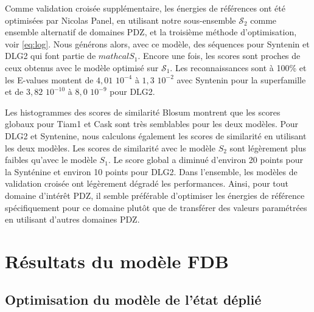 Comme validation croisée supplémentaire, les énergies de références ont été optimisées par Nicolas Panel, en utilisant notre sous-ensemble $\mathcal{S}_2$ comme ensemble alternatif de domaines PDZ, et la troisième méthode d'optimisation, voir \ref{eq:log}. Nous générons alors, avec ce modèle, des séquences pour Syntenin et DLG2 qui font partie de $mathcal{S}_1$. Encore une fois, les scores sont proches de ceux obtenus avec le modèle optimisé sur $\mathcal{S}_1$. Les reconnaissances sont à 100\% et les E-values montent de $4,01$ $10^{-4}$  à $1,3$ $10^{-2}$  avec Syntenin pour la superfamille et de $3,82$ $10^{-10}$  à $8,0$ $10^{-9}$ pour DLG2.

Les histogrammes des scores de similarité Blosum montrent que les scores globaux pour Tiam1 et Cask sont très semblables pour les deux modèles. Pour DLG2 et Syntenine, nous calculons également les scores de similarité en utilisant les deux modèles. Les scores de similarité avec le modèle $S_2$  sont légèrement plus faibles qu'avec le modèle $S_1$. Le score global a diminué d'environ 20 points pour la Synténine et environ 10 points pour DLG2. Dans l'ensemble, les modèles de validation croisée ont légèrement dégradé les performances. Ainsi, pour tout domaine d'intérêt PDZ, il semble préférable d'optimiser les énergies de référence spécifiquement pour ce domaine plutôt que de transférer des valeurs paramétrées en utilisant d'autres domaines PDZ. 

\section{Résultats du modèle FDB}

\subsection{Optimisation du modèle de l'état déplié}


